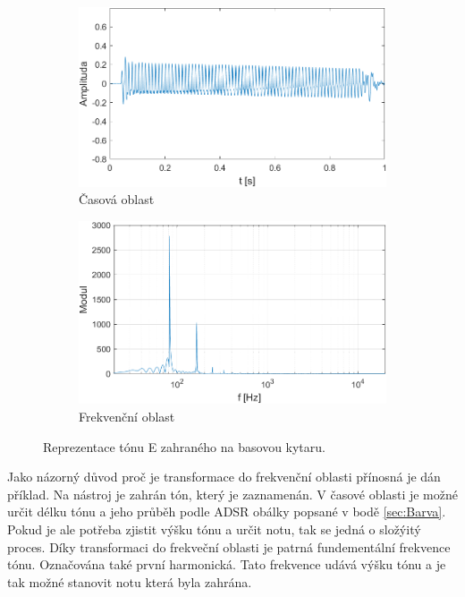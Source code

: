   \begin{figure}[H]
    \centering
    \begin{subfigure}[b]{0.8\linewidth}
        \includegraphics[width = \linewidth]{obrazky/Bass_tone_waveform.png}
        \caption{Časová oblast}
    \end{subfigure}
    \begin{subfigure}[b]{0.8\linewidth}
        \includegraphics[width = \linewidth]{obrazky/Bass_tone_spectrum.png}
        \caption{Frekvenční oblast}
    \end{subfigure}
    \caption{Reprezentace tónu E zahraného na basovou kytaru.}
    \label{fig:Bass_tone}
\end{figure}
  
  Jako názorný důvod proč je transformace do frekvenční oblasti přínosná je dán příklad. Na nástroj je zahrán tón, který je zaznamenán. 
  V časové oblasti je možné určit délku tónu a jeho průběh podle ADSR obálky popsané v bodě \ref*{sec:Barva}.
  Pokud je ale potřeba zjistit výšku tónu a určit notu, tak se jedná o složýitý proces.
  Díky transformaci do frekveční oblasti je patrná fundementální frekvence tónu.
  Označována také první harmonická.
  Tato frekvence udává výšku tónu a je tak možné stanovit notu která byla zahrána.


